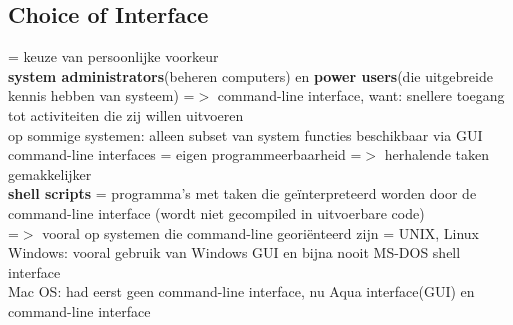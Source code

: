 \documentclass{report}
\begin{document}
\subsection{Choice of Interface}
= keuze van persoonlijke voorkeur 
\\ \textbf{system administrators}(beheren computers) en \textbf{power users}(die uitgebreide kennis hebben van systeem) =$>$ command-line interface, want: snellere toegang tot activiteiten die zij willen uitvoeren
\\op sommige systemen: alleen subset van system functies beschikbaar via GUI
\\command-line interfaces = eigen programmeerbaarheid =$>$ herhalende taken gemakkelijker
\\ \textbf{shell scripts} = programma's met taken die ge\"interpreteerd worden door de command-line interface (wordt niet gecompiled in uitvoerbare code)
\\ =$>$ vooral op systemen die command-line georiënteerd zijn = UNIX, Linux 
\\ Windows: vooral gebruik van Windows GUI en bijna nooit MS-DOS shell interface
\\ Mac OS: had eerst geen command-line interface, nu Aqua interface(GUI) en command-line interface
\end{document}
